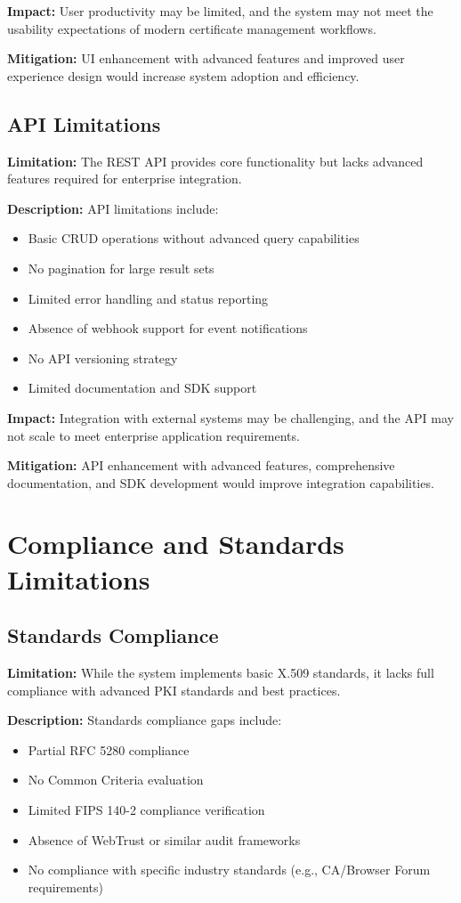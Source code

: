 \textbf{Impact:} User productivity may be limited, and the system may not meet the usability expectations of modern certificate management workflows.

\textbf{Mitigation:} UI enhancement with advanced features and improved user experience design would increase system adoption and efficiency.

\subsection{API Limitations}

\textbf{Limitation:} The REST API provides core functionality but lacks advanced features required for enterprise integration.

\textbf{Description:} API limitations include:
\begin{itemize}
    \item Basic CRUD operations without advanced query capabilities
    \item No pagination for large result sets
    \item Limited error handling and status reporting
    \item Absence of webhook support for event notifications
    \item No API versioning strategy
    \item Limited documentation and SDK support
\end{itemize}

\textbf{Impact:} Integration with external systems may be challenging, and the API may not scale to meet enterprise application requirements.

\textbf{Mitigation:} API enhancement with advanced features, comprehensive documentation, and SDK development would improve integration capabilities.

\section{Compliance and Standards Limitations}

\subsection{Standards Compliance}

\textbf{Limitation:} While the system implements basic X.509 standards, it lacks full compliance with advanced PKI standards and best practices.

\textbf{Description:} Standards compliance gaps include:
\begin{itemize}
    \item Partial RFC 5280 compliance
    \item No Common Criteria evaluation
    \item Limited FIPS 140-2 compliance verification
    \item Absence of WebTrust or similar audit frameworks
    \item No compliance with specific industry standards (e.g., CA/Browser Forum requirements)
\end{itemize}

